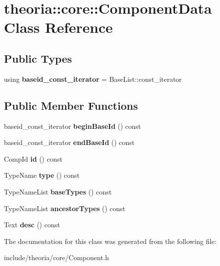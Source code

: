 \hypertarget{classtheoria_1_1core_1_1ComponentData}{}\section{theoria\+:\+:core\+:\+:Component\+Data Class Reference}
\label{classtheoria_1_1core_1_1ComponentData}
\subsection*{Public Types}
\begin{DoxyCompactItemize}
\item 
\mbox{\label{classtheoria_1_1core_1_1ComponentData_a66b4a86a617891cfd780d447c82b88b0}} 
using {\bfseries baseid\+\_\+const\+\_\+iterator} = Base\+List\+::const\+\_\+iterator
\end{DoxyCompactItemize}
\subsection*{Public Member Functions}
\begin{DoxyCompactItemize}
\item 
\mbox{\label{classtheoria_1_1core_1_1ComponentData_ac066a43ccf51a3cc4e4e6b33eead20bf}} 
baseid\+\_\+const\+\_\+iterator {\bfseries begin\+Base\+Id} () const
\item 
\mbox{\label{classtheoria_1_1core_1_1ComponentData_adf1cc588e245d34e2a8d7cd44d9580fb}} 
baseid\+\_\+const\+\_\+iterator {\bfseries end\+Base\+Id} () const
\item 
\mbox{\label{classtheoria_1_1core_1_1ComponentData_a9b798845fc5503383db56c04e6d70080}} 
Comp\+Id {\bfseries id} () const
\item 
\mbox{\label{classtheoria_1_1core_1_1ComponentData_a4b2baf668db4d31d43898d9b8e7246c6}} 
Type\+Name {\bfseries type} () const
\item 
\mbox{\label{classtheoria_1_1core_1_1ComponentData_a37830d7e2cfdf40f37dde16e7be25f37}} 
Type\+Name\+List {\bfseries base\+Types} () const
\item 
\mbox{\label{classtheoria_1_1core_1_1ComponentData_a0f058607e3942fb7afa92b57cbe9247d}} 
Type\+Name\+List {\bfseries ancestor\+Types} () const
\item 
\mbox{\label{classtheoria_1_1core_1_1ComponentData_a2c78f474020e909d32fde895bd575cc6}} 
Text {\bfseries desc} () const
\end{DoxyCompactItemize}


The documentation for this class was generated from the following file\+:\begin{DoxyCompactItemize}
\item 
include/theoria/core/Component.\+h\end{DoxyCompactItemize}
